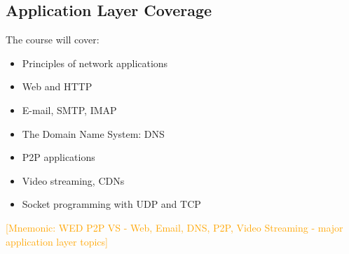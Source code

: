 \documentclass[12pt]{article}
\begin{document}
\subsection{Application Layer Coverage}
The course will cover:
\begin{itemize}
    \item Principles of network applications
    \item Web and HTTP
    \item E-mail, SMTP, IMAP
    \item The Domain Name System: DNS
    \item P2P applications
    \item Video streaming, CDNs
    \item Socket programming with UDP and TCP
\end{itemize}

\textcolor{orange}{[Mnemonic: WED P2P VS - Web, Email, DNS, P2P, Video Streaming - major application layer topics]}
\end{document}
